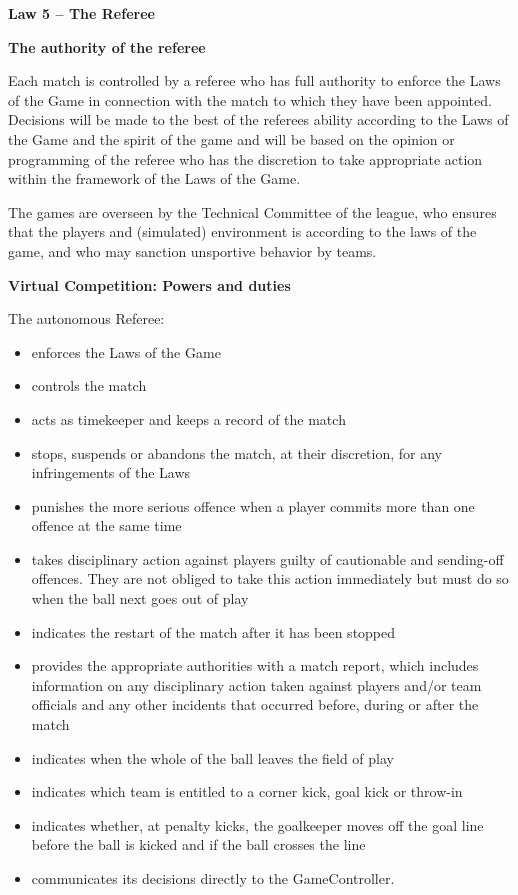 \clearpage
\sffamily
{\bfseries\color[rgb]{0.4,0.4,0.4}
Law 5 -- The Referee}
{}

\bigskip

{\bfseries The authority of the referee}

\headlinebox

Each match is controlled by a referee who has full authority to enforce the Laws
of the Game in connection with the match to which they have been appointed.
Decisions will be made to the best of the referees ability according to the Laws
of the Game and the spirit of the game and will be based on the opinion or programming of the
referee who has the discretion to take appropriate action within the framework
of the Laws of the Game.

The games are overseen by the Technical Committee of the league, who ensures that the players and (simulated) environment is according to the laws of the game, and who may sanction unsportive behavior by teams.

\bigskip

{\bfseries Virtual Competition: Powers and duties}

\headlinebox

The autonomous Referee:

\begin{itemize}
\item enforces the Laws of the Game
\item controls the match
\item acts as timekeeper and keeps a record of the match
\item stops, suspends or abandons the match, at their discretion, for any infringements of the Laws
\item punishes the more serious offence when a player commits more than one offence at the same time
\item takes disciplinary action against players guilty of cautionable and sending-off offences. They are not obliged to take this action immediately but must do so when the ball next goes out of play
\item indicates the restart of the match after it has been stopped 
\item provides the appropriate authorities with a match report, which includes information on any disciplinary action taken against players and/or team officials and any other incidents that occurred before, during or after
the match 
\item indicates when the whole of the ball leaves the field of play
\item indicates which team is entitled to a corner kick, goal kick or throw-in
\item indicates whether, at penalty kicks, the goalkeeper moves off the goal line before the ball is kicked and if the ball crosses the line
\item communicates its decisions directly to the GameController.
\end{itemize}

